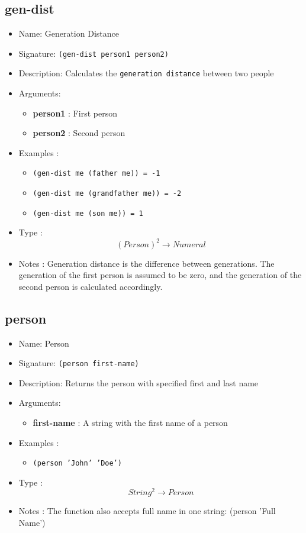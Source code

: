 \subsection{gen-dist}
\begin{itemize}
    \item Name: Generation Distance
    \item Signature: \texttt{(gen-dist person1 person2)}
    \item Description: Calculates the \texttt{generation distance} between two people
    \item Arguments:
        \begin{itemize}
            \item \textbf{person1} : First person
            \item \textbf{person2} : Second person
        \end{itemize}
    \item Examples :
        \begin{itemize}
            \item \texttt{(gen-dist me (father me)) = -1}
            \item \texttt{(gen-dist me (grandfather me)) = -2}
            \item \texttt{(gen-dist me (son me)) = 1}
        \end{itemize}
    \item Type : \[(Person)^2 \to Numeral\]
    \item Notes : Generation distance is the difference between generations. The generation of the first person is assumed to be zero, and the generation of the second person is calculated accordingly.
\end{itemize}

\subsection{person}
\begin{itemize}
    \item Name: Person
    \item Signature: \texttt{(person first-name)}
    \item Description: Returns the person with specified first and last name
    \item Arguments:
        \begin{itemize}
            \item \textbf{first-name} : A string with the first name of a person
        \end{itemize}
    \item Examples :
        \begin{itemize}
            \item \texttt{(person 'John' 'Doe')}
        \end{itemize}
    \item Type : \[String^2 \to Person\]
    \item Notes : The function also accepts full name in one string: (person 'Full Name')
\end{itemize}

